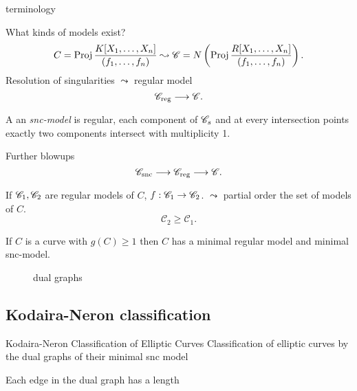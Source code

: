 \begin{frame}{terminology}
\begin{figure}[ht]
    \centering
\end{figure}
\end{frame}



\begin{frame}
	What kinds of models exist?\[
		C = \operatorname{Proj} \frac{K[X_1, \ldots, X_n]}{(f_1, \ldots, f_n)}
		\leadsto \mathscr C = N\left(\operatorname{Proj} \frac{R[X_1, \ldots, X_n]}{(f_1, \ldots, f_n)}\right)
	.\] 
	\pause
	Resolution of singularities $\leadsto $ regular model 
	\[
	\mathscr C _\text{reg}  \longrightarrow \mathscr C 
	.\] \pause
	\begin{definition}
		A an \emph{snc-model} is regular, each component of $\mathscr C_s$ and at every intersection points exactly two components intersect with multiplicity 1. 
	\end{definition}
	\pause
	Further blowups \[
	\mathscr {\mathscr C}_\text{snc} \longrightarrow \mathscr {\mathscr C}_\text{reg} \longrightarrow \mathscr {\mathscr C}
	.\] 
\end{frame}

\begin{frame}
	If $\mathscr C_1, \mathscr C_2$ are regular models of $C$, $f: \mathscr C_1 \to \mathscr C_2$.
	$\leadsto$ partial order the set of models of $C$. 
	\[
	\mathscr C_2 \ge \mathscr C_1
	.\] 
\begin{theorem}
		If $C$ is a curve with $g(C) \ge 1$ then $C$ has a minimal regular model and minimal snc-model.
\end{theorem}
\end{frame}

\begin{frame}
\begin{figure}[ht]
    \centering
    \caption{dual graphs}
    \label{fig:dual-graphs}
\end{figure}
\end{frame}



\subsection{Kodaira-Neron classification} \label{sec:kodaira-neron_classification}

\begin{frame}{Kodaira-Neron Classification of Elliptic Curves}
	Classification of elliptic curves by the dual graphs of their minimal snc model
		\pause
	\begin{figure}[ht]
    \centering
\end{figure}
\end{frame}

\begin{frame}
	Each edge in the dual graph has a length
\begin{figure}[ht]
    \centering
\end{figure}
\end{frame}





